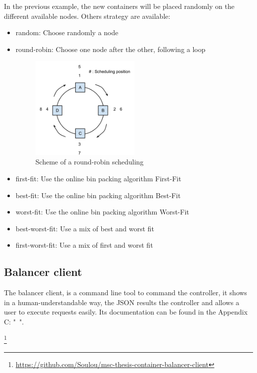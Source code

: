 In the previous example, the new containers will be placed randomly on the different
available nodes. Others strategy are available:

\begin{itemize}
\item{random: Choose randomly a node}
\item{round-robin: Choose one node after the other, following a loop
\begin{figure}[h!]
\begin{center}
\includegraphics[width=0.5\textwidth]{./Images/round-robin.png}
\caption{Scheme of a round-robin scheduling}
\end{center}
\end{figure}}
\item{first-fit: Use the online bin packing algorithm First-Fit}
\item{best-fit: Use the online bin packing algorithm Best-Fit}
\item{worst-fit: Use the online bin packing algorithm Worst-Fit}
\item{best-worst-fit: Use a mix of best and worst fit}
\item{first-worst-fit: Use a mix of first and worst fit}
\end{itemize}

\subsection{Balancer client}

The balancer client, is a command line tool to command the controller, it
shows in a human-understandable way, the JSON results the controller and allows
a user to execute requests easily. Its documentation can be found in the
Appendix C: "~".

\footnote{\url{https://github.com/Soulou/msc-thesis-container-balancer-client}}

